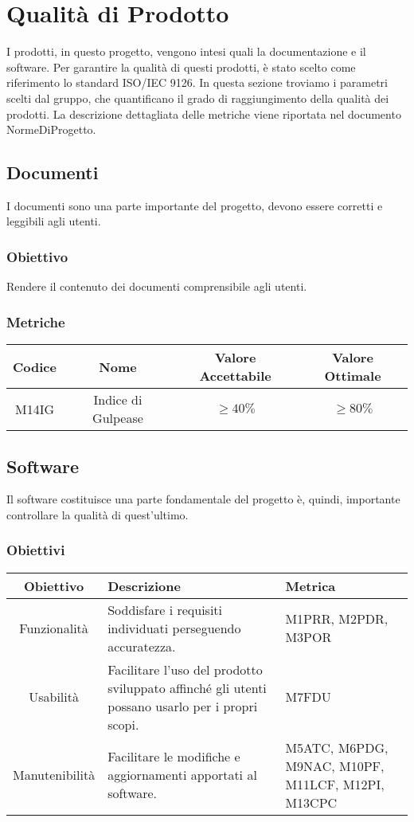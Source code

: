 \section{Qualità di Prodotto}
I prodotti, in questo progetto, vengono intesi quali la documentazione e il software. Per garantire la qualità di questi prodotti, è stato scelto come riferimento lo standard ISO/IEC 9126. In questa sezione troviamo i parametri scelti dal gruppo, che quantificano il grado di raggiungimento della qualità dei prodotti. La descrizione dettagliata delle metriche viene riportata nel documento NormeDiProgetto.

\subsection{Documenti}
I documenti sono una parte importante del progetto, devono essere corretti e leggibili agli utenti.
\subsubsection{Obiettivo}
Rendere il contenuto dei documenti comprensibile agli utenti.
\subsubsection{Metriche}
\begin{center}
\renewcommand{\arraystretch}{1.8}
\begin{tabular}{ |c|c|c|c|}
	\hline
	\textbf{Codice} & \textbf{Nome} & \textbf{Valore Accettabile} & \textbf{Valore Ottimale} \\
	\hline
	M14IG & Indice di Gulpease &  $\geq 40 \%$ & $\geq 80 \%$ \\
	\hline
\end{tabular}
\end{center}

\subsection{Software}
Il software costituisce una parte fondamentale del progetto è, quindi, importante controllare la qualità di quest'ultimo.

\subsubsection{Obiettivi}
\begin{center}
	\renewcommand{\arraystretch}{1.8}
	\begin{tabular}{ |c|m{18em}|m{8em}|}
		\hline
		\textbf{Obiettivo} & \textbf{Descrizione} & \textbf{Metrica} \\
		\hline
		Funzionalità & Soddisfare i requisiti individuati perseguendo accuratezza. & M1PRR, M2PDR, M3POR \\
		\hline
		Usabilità & Facilitare l'uso del prodotto sviluppato affinché gli utenti possano usarlo per i propri scopi. & M7FDU \\
		\hline
		Manutenibilità & Facilitare le modifiche e aggiornamenti apportati al software. & M5ATC, M6PDG, M9NAC, M10PF, M11LCF, M12PI, M13CPC \\
		\hline
	\end{tabular}
\end{center}

